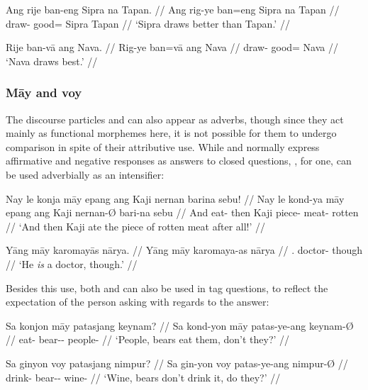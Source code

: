 \pex
\a\begingl
	\gla Ang rije ban-eng Sipra na Tapan. //
	\glb Ang rig-ye ban=eng Sipra na Tapan //
	\glc \AgtT{} draw-\TsgF{} good=\Comp{} Sipra \Gen{} Tapan //
	\glft `Sipra draws better than Tapan.' //
\endgl

\a\begingl
	\gla Rije ban-vā ang Nava. //
	\glb Rig-ye ban=vā ang Nava //
	\glc draw-\TsgF{} good=\Supl{} \Aarg{} Nava //
	\glft `Nava draws best.' //
\endgl
\xe


\subsubsection{Māy and voy}

The discourse particles  and  can 
also appear as adverbs, though since they act mainly as functional morphemes 
here, it is not possible for them to undergo comparison in spite of their 
attributive use. While  and  normally 
express affirmative and negative responses as answers to closed questions, 
, for one, can be used adverbially as an intensifier:

\pex
\a\begingl
	\gla Nay le konja māy epang ang Kaji nernan barina sebu! //
	\glb Nay le kond-ya māy epang ang Kaji nernan-Ø bari-na sebu //
	\glc And \PatTI{} eat-\TsgM{} \Int{} then \Aarg{} Kaji piece-\Top{} 
		meat-\Gen{} rotten //
	\glft `And then Kaji ate the piece of rotten meat after all!' //
\endgl

\a\begingl
	\gla Yāng māy karomayās nārya. //
	\glb Yāng māy karomaya-as nārya //
	\glc \TsgM{}.\Aarg{} \Int{} doctor-\Parg{} though // 
	\glft `He \emph{is} a doctor, though.' //
\endgl
\xe

Besides this use, both  and  can also be used in 
tag questions, to reflect the expectation of the person asking with regards to 
the answer:

\pex
\a\label{ex:posexpect}\begingl
	\gla Sa konjon māy patasjang keynam? //
	\glb Sa kond-yon māy patas-ye-ang keynam-Ø //
	\glc \PatT{} eat-\TplN{} \Aff{} bear-\Pl{}-\Aarg{} people-\Top{} //
	\glft `People, bears eat them, don't they?' //
\endgl

\a\label{ex:negexpect}\begingl
	\gla Sa ginyon voy patasjang nimpur? //
	\glb Sa gin-yon voy patas-ye-ang nimpur-Ø //
	\glc \PatT{} drink-\TplN{} \Neg{} bear-\Pl{}-\Aarg{} wine-\Top{} //
	\glft `Wine, bears don't drink it, do they?' //
\endgl
\xe

